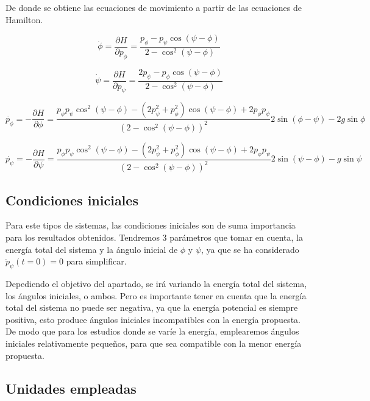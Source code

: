 \documentclass[11pt, twoside]{article} %
\begin{document}
De donde se obtiene las ecuaciones de movimiento a partir de las 
ecuaciones de Hamilton.

\begin{equation}
        \dot{\phi} = \frac{\partial H}{\partial p_\phi} = \frac{p_\phi - p_\psi\cos(\psi - \phi)}{2-\cos^2(\psi - \phi)} 
\end{equation}

\begin{equation}
    \dot{\psi} = \frac{\partial H}{\partial p_\psi} = \frac{2p_\psi - p_\phi\cos(\psi - \phi)}{2-\cos^2(\psi - \phi)}
\end{equation}

\begin{equation}
    \dot{p_\phi} = -\frac{\partial H}{\partial \phi} =  \frac{p_\phi p_\psi \cos^2(\psi - \phi) - (2p_\psi^2 + p_\phi^2)\cos(\psi - \phi) + 2p_\phi p_\psi }{(2-\cos^2(\psi - \phi))^2}2\sin(\phi - \psi) -2g\sin\phi
\end{equation}

\begin{equation}
    \dot{p_\psi} = -\frac{\partial H}{\partial \psi} =  \frac{p_\phi p_\psi \cos^2(\psi - \phi) - (2p_\psi^2 + p_\phi^2)\cos(\psi - \phi) + 2p_\phi p_\psi }{(2-\cos^2(\psi - \phi))^2}2\sin(\psi - \phi) -g\sin\psi
\end{equation}

\subsection{Condiciones iniciales}

Para este tipos de sistemas, las condiciones iniciales son de suma 
importancia para los resultados obtenidos. Tendremos 3 parámetros que tomar
en cuenta, la energía total del sistema y la ángulo inicial de $\phi$ y
$\psi$, ya que se ha considerado $\dot{p}_\psi (t=0) = 0$ para simplificar.

Depediendo el objetivo del apartado, se irá variando la energía total 
del sistema, los ángulos iniciales, o ambos. Pero es importante tener en
cuenta que la energía total del sistema no puede ser negativa, ya que
la energía potencial es siempre positiva, esto produce ángulos iniciales
incompatibles con la energía propuesta. De modo que para los estudios donde
se varíe la energía, emplearemos ángulos iniciales relativamente pequeños, 
para que sea compatible con la menor energía propuesta.

\subsection{Unidades empleadas}
\end{document}
